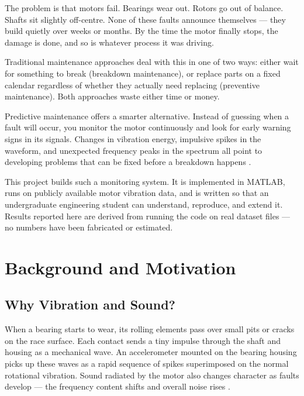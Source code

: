 \documentclass[12pt,a4paper]{article}
\begin{document}
The problem is that motors fail. Bearings wear out. Rotors go out
of balance. Shafts sit slightly off-centre. None of these faults
announce themselves --- they build quietly over weeks or months.
By the time the motor finally stops, the damage is done, and so is
whatever process it was driving.

Traditional maintenance approaches deal with this in one of two
ways: either wait for something to break (breakdown maintenance),
or replace parts on a fixed calendar regardless of whether they
actually need replacing (preventive maintenance). Both approaches
waste either time or money.

Predictive maintenance offers a smarter alternative. Instead of
guessing when a fault will occur, you monitor the motor
continuously and look for early warning signs in its signals.
Changes in vibration energy, impulsive spikes in the waveform, and
unexpected frequency peaks in the spectrum all point to developing
problems that can be fixed before a breakdown happens
\cite{nandi2005}.

This project builds such a monitoring system. It is implemented
in MATLAB, runs on publicly available motor vibration data, and
is written so that an undergraduate engineering student can understand,
reproduce, and extend it. Results reported here are derived from
running the code on real dataset files --- no numbers have been
fabricated or estimated.

\section{Background and Motivation}

\subsection{Why Vibration and Sound?}

When a bearing starts to wear, its rolling elements pass over small
pits or cracks on the race surface. Each contact sends a tiny
impulse through the shaft and housing as a mechanical wave. An
accelerometer mounted on the bearing housing picks up these waves
as a rapid sequence of spikes superimposed on the normal rotational
vibration. Sound radiated by the motor also changes character as
faults develop --- the frequency content shifts and overall noise
rises \cite{randall2011}.
\end{document}
